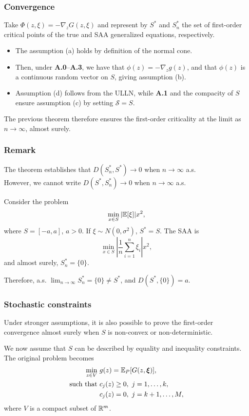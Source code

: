 \documentclass{beamer}
\begin{document}
\begin{frame}
\frametitle{Convergence}

Take $\Phi(z,\xi) = -\nabla_z G(z, \xi)$ and represent by $S^*$ and $S^*_n$ the set of first-order critical points of the true and SAA generalized equations, respectively.

\begin{itemize}
\item
The assumption (a) holds by definition of the normal cone.
\item
Then, under \textbf{A.0}--\textbf{A.3}, we have that $\phi(z) = -\nabla_z
g(z)$, and that $\phi(z)$ is a continuous random vector on $S$, giving assumption (b).
\item
Assumption (d) follows from the ULLN, while \textbf{A.1} and the compacity of $S$ ensure assumption (c) by setting $\mathcal{S} = S$. 
\end{itemize}

The previous theorem therefore ensures the first-order criticality at the limit as $n\rightarrow\infty$, almost surely.

\end{frame}

\begin{frame}
\frametitle{Remark}

The theorem establishes that $D(S_n^*, S^*) \rightarrow 0$ when $n \rightarrow \infty$ a.s.\\
However, we cannot write $D(S^*, S_n^*) \rightarrow 0$ when $n \rightarrow \infty$ a.s.

\mbox{}

Consider the problem
$$
\min_{x \in S} |{\mathbb{E}}[\xi]| x^2,
$$
where $S = [-a,a]$, $a > 0$. If $\xi \sim N(0, \sigma^2)$, $S^* = S$.
The SAA is
$$
\min_{x \in S} \left|\frac{1}{n} \sum_{i=1}^n \xi_i\right| x^2,
$$
and almost surely, $S^*_n = \{ 0 \}$.

Therefore, a.s. $\lim_{n \rightarrow \infty} S^*_n = \{ 0 \} \ne S^*$, and $D(S^*, \{0\}) = a$.

\end{frame}

\begin{frame}
\frametitle{Stochastic constraints}

Under stronger assumptions, it is also possible to prove the first-order convergence almost surely when $S$ is non-convex or non-deterministic.

\mbox{}

We now assume that $S$ can be described by equality and inequality constraints.
The original problem becomes
\begin{align*}
\min_{z \in V}\ & g(z) = {\mathbb{E}}_P[G(z, \boldsymbol{\xi})],\\
\text{such that } & c_j(z) \geq 0,\ j = 1,\ldots,k,\\
& c_j(z) = 0,\ j = k+1,\ldots, M,
\end{align*}
where $V$ is a compact subset of $\mathbb{R}^m$.

\end{frame}
\end{document}
